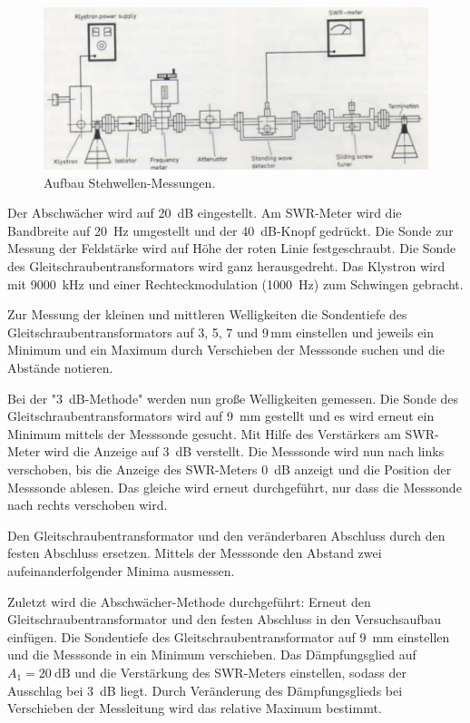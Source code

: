 \FloatBarrier
\begin{figure}
  \centering
  \includegraphics[scale=0.3]{Versuch3.Aufbau.png}
  \caption{Aufbau Stehwellen-Messungen. \cite{Q1}}
  \label{abb:Versuch3.Aufbau}
\end{figure}
\FloatBarrier

Der Abschwächer wird auf \SI{20}{\dB} eingestellt. Am SWR-Meter wird die
Bandbreite auf \SI{20}{\hertz} umgestellt und der \SI{40}{\dB}-Knopf gedrückt.
Die Sonde zur Messung der Feldstärke wird auf Höhe der roten Linie festgeschraubt.
Die Sonde des Gleitschraubentransformators wird ganz herausgedreht.
Das Klystron wird mit \SI{9000}{\kilo\hertz} und einer Rechteckmodulation
(\SI{1000}{\hertz}) zum Schwingen gebracht.

Zur Messung der kleinen und mittleren Welligkeiten die Sondentiefe des
Gleitschraubentransformators auf 3, 5, 7 und 9\,mm einstellen und jeweils ein
Minimum und ein Maximum  durch Verschieben der Messsonde suchen und die Abstände
notieren.

Bei der "\SI{3}{\dB}-Methode" werden nun große Welligkeiten gemessen. Die Sonde
des Gleitschraubentransformators wird auf \SI{9}{\milli\meter} gestellt und es
wird erneut ein Minimum mittels der Messsonde gesucht. Mit Hilfe des Verstärkers
am SWR-Meter wird die Anzeige auf \SI{3}{\dB} verstellt. Die Messsonde wird nun
nach links verschoben, bis die Anzeige des SWR-Meters \SI{0}{\dB} anzeigt und
die Position der Messsonde ablesen. Das gleiche wird erneut durchgeführt, nur dass
die Messsonde nach rechts verschoben wird.

Den Gleitschraubentransformator und den veränderbaren Abschluss durch den
festen Abschluss ersetzen. Mittels der Messsonde den Abstand zwei
aufeinanderfolgender Minima ausmessen.

Zuletzt wird die Abschwächer-Methode durchgeführt:
Erneut den Gleitschraubentransformator und den festen Abschluss in den
Versuchsaufbau einfügen. Die Sondentiefe des Gleitschraubentransformator auf
\SI{9}{\milli\meter} einstellen und die Messsonde in ein Minimum verschieben.
Das Dämpfungsglied auf $A_1=\SI{20}{\dB}$ und die Verstärkung des SWR-Meters
einstellen, sodass der Ausschlag bei \SI{3}{\dB} liegt. Durch Veränderung des
Dämpfungsglieds bei Verschieben der Messleitung wird das relative Maximum
bestimmt.


